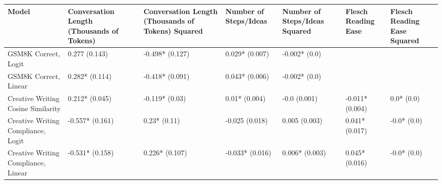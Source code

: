 \begin{tabular}{x{1.5cm}|x{1.5cm}|x{1.5cm}|x{1.5cm}|x{1.5cm}|x{1.5cm}|x{1.5cm}}
\toprule
\hline
Model & Conversation Length (Thousands of Tokens) & Conversation Length (Thousands of Tokens) Squared & Number of Steps/Ideas & Number of Steps/Ideas Squared & Flesch Reading Ease & Flesch Reading Ease Squared \\
\hline
\midrule
GSM8K Correct, Logit & 0.277 (0.143) & -0.498* (0.127) & 0.029* (0.007) & -0.002* (0.0) &  &  \\
\hline
GSM8K Correct, Linear & 0.282* (0.114) & -0.418* (0.091) & 0.043* (0.006) & -0.002* (0.0) &  &  \\
\hline
Creative Writing Cosine Similarity & 0.212* (0.045) & -0.119* (0.03) & 0.01* (0.004) & -0.0 (0.001) & -0.011* (0.004) & 0.0* (0.0) \\
\hline
Creative Writing Compliance, Logit & -0.557* (0.161) & 0.23* (0.11) & -0.025 (0.018) & 0.005 (0.003) & 0.041* (0.017) & -0.0* (0.0) \\
\hline
Creative Writing Compliance, Linear & -0.531* (0.158) & 0.226* (0.107) & -0.033* (0.016) & 0.006* (0.003) & 0.045* (0.016) & -0.0* (0.0) \\
\hline
\bottomrule
\end{tabular}
